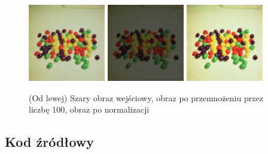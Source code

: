 \documentclass[final,a4paper,openany,12pt]{mwbk}
\begin{document}
\begin{figure}[H]
	\begin{center}
		\includegraphics[width=0.3\textwidth]{2/2Color_Const_Multipl_Original}
		\includegraphics[width=0.3\textwidth]{2/2Color_Const_Multipl_Result}
		\includegraphics[width=0.3\textwidth]{2/2Color_Const_Multipl_Result_Norm}
	\end{center}
	\caption{(Od lewej) Szary obraz wejściowy, obraz po przemnożeniu przez liczbę 100, obraz po normalizacji }
\end{figure}

\subsection*{Kod źródłowy}
\end{document}
